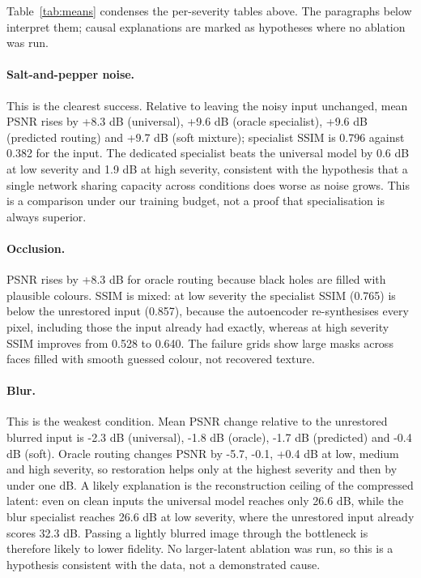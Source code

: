 \documentclass[conference]{IEEEtran}
\begin{document}
Table~\ref{tab:means} condenses the per-severity tables above. The paragraphs below interpret them; causal explanations are marked as hypotheses where no ablation was run.

\paragraph{Salt-and-pepper noise.} This is the clearest success. Relative to leaving the noisy input unchanged, mean PSNR rises by +8.3 dB (universal), +9.6 dB (oracle specialist), +9.6 dB (predicted routing) and +9.7 dB (soft mixture); specialist SSIM is 0.796 against 0.382 for the input. The dedicated specialist beats the universal model by 0.6 dB at low severity and 1.9 dB at high severity, consistent with the hypothesis that a single network sharing capacity across conditions does worse as noise grows. This is a comparison under our training budget, not a proof that specialisation is always superior.

\paragraph{Occlusion.} PSNR rises by +8.3 dB for oracle routing because black holes are filled with plausible colours. SSIM is mixed: at low severity the specialist SSIM (0.765) is below the unrestored input (0.857), because the autoencoder re-synthesises every pixel, including those the input already had exactly, whereas at high severity SSIM improves from 0.528 to 0.640. The failure grids show large masks across faces filled with smooth guessed colour, not recovered texture.

\paragraph{Blur.} This is the weakest condition. Mean PSNR change relative to the unrestored blurred input is -2.3 dB (universal), -1.8 dB (oracle), -1.7 dB (predicted) and -0.4 dB (soft). Oracle routing changes PSNR by -5.7, -0.1, +0.4 dB at low, medium and high severity, so restoration helps only at the highest severity and then by under one dB. A likely explanation is the reconstruction ceiling of the compressed latent: even on clean inputs the universal model reaches only 26.6 dB, while the blur specialist reaches 26.6 dB at low severity, where the unrestored input already scores 32.3 dB. Passing a lightly blurred image through the bottleneck is therefore likely to lower fidelity. No larger-latent ablation was run, so this is a hypothesis consistent with the data, not a demonstrated cause.
\end{document}

